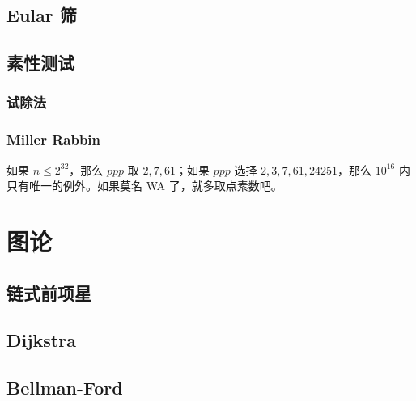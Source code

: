 \documentclass[cn,11pt,black,normal,founder]{elegantbook}
\begin{document}


\section{Eular 筛}



\section{素性测试}

\subsection{试除法}



\subsection{Miller Rabbin}

如果 $n\leqslant 2^{32}$，那么 $ppp$ 取 $2,7,61$；如果 $ppp$ 选择 $2,3,7,61,24251$，那么 $10^{16}$ 内只有唯一的例外。如果莫名 WA 了，就多取点素数吧。





\chapter{图论}

\section{链式前项星}



\section{Dijkstra}



\section{Bellman-Ford}
\end{document}
